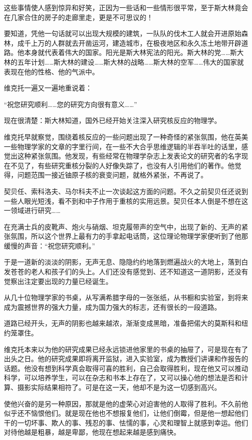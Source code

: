 这些事情使人感到惊异和好笑，正因为一些话和一些情形很平常，至于斯大林竟会在几家合住的房子的走廊里走，更是不可思议的！

要知道，凭他一句话就可以出现大规模的建筑，一队队的伐木工人就会开进原始森林，成千上万的人群就去开凿运河，建造城市，在极夜地区和永久冻土地带开辟道路。他本身就代表着伟大的国家。阳光是斯大林宪法的阳光。斯大林的党……斯大林的五年计划……斯大林的建设……斯大林的战略……斯大林的空军……伟大的国家就表现在他的性格、他的气派中。

维克托一遍又一遍地重说着：

“祝您研究顺利……您的研究方向很有意义……”

现在很清楚：斯大林知道，国外已经开始关注深入研究核反应的物理学。

维克托早就察觉，围绕着核反应的一些问题出现了一种奇怪的紧张氛围，他在英美一些物理学家的文章的字里行间，在一些不大合乎思维逻辑的半吞半吐的话里，感觉出这种紧张氛围。他发现，有些经常在物理学杂志上发表论文的研究者的名字现在不见了，有些研究重核分裂的人好像失踪了，也没有人引用他们的著作。他觉得，问题范围一接近铀原子核的衰变问题，就格外紧张，不再说了。

契贝任、索科洛夫、马尔科夫不止一次谈起这方面的问题。不久之前契贝任还说到一些人眼光短浅，看不到和中子作用于重核的实用远景。契贝任本人倒是不想在这一领域进行研究……

在充满士兵的皮靴声、炮火与硝烟、坦克履带声的空气中，出现了新的、无声的紧张氛围，所以这个世界上最有力的手拿起电话筒，这位理论物理学家便听到了他那缓慢的声音：“祝您研究顺利。”

于是一道新的淡淡的阴影，无声无息、隐隐约约地落到燃遍战火的大地上，落到白发苍苍的老人和孩子们的头上。人们还没有感觉到、还不知道这一道阴影，还没有觉察出注定要出现的力量已经诞生。

从几十位物理学家的书桌，从写满希腊字母的一张张纸，从书橱和实验室，到将来成为震撼世界的强大力量，成为国力强大的标志，还有很长的一段道路。

道路已经开头，无声的阴影也越来越浓，渐渐变成黑暗，准备把偌大的莫斯科和纽约笼罩住。

维克托本来以为他的研究成果已经永远锁进他家里的书桌的抽屉了，可是现在有了出头之日。他的研究成果即将离开监狱，进入实验室，成为教授们讲课和作报告的话题。他没有想到科学真会取得可喜的胜利，自己会取得胜利，现在他又可以推动科学，可以培养学生，可以在杂志和书本上存在了，又可以操心他的想法是否和计算、摄影实际结果相符了。可是在这一天，他却不是为这一切感到高兴。

使他兴奋的是另一种原因，那就是他的虚荣心对迫害他的人取得了胜利。不久前他似乎还不恼恨他们。就是现在他也不想报复他们，让他们倒霉，但是他一想起他们干的一切坏事、欺人的事、残忍的事、怯懦的事，心灵和理智上就感到幸运。他们对待他越是粗暴，越是卑鄙，他现在想起来越是感到痛快。

